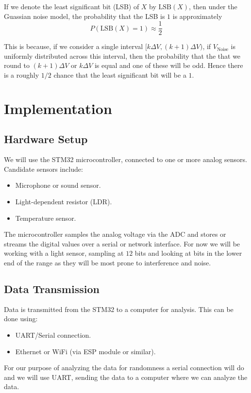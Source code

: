 If we denote the least significant bit (LSB) of \(X\) 
by \(\text{LSB}(X)\), then under the Guassian noise model, 
the probability that the LSB is \(1\) is approximately 
\[ 
    P(\text{LSB}(X) = 1) \approx \frac{1}{2} 
\]

This is because, if we consider a single interval 
\([k\Delta V, (k+1)\Delta V)\), if $V_\text{Noise}$ is uniformly 
distributed across this interval, then the probability that the 
that we round to $(k+1)\Delta V$ or $k\Delta V$ is equal and one 
of these will be odd. Hence there is a roughly $1/2$ chance 
that the least significant bit will be a $1$.


\newpage
\section{Implementation}
\subsection{Hardware Setup}
We will use the STM32 microcontroller, connected to one or more analog 
sensors. Candidate sensors include:
\begin{itemize}
    \item Microphone or sound sensor.
    \item Light-dependent resistor (LDR).
    \item Temperature sensor.
\end{itemize}

The microcontroller samples the analog voltage via the ADC and 
stores or 
streams the digital values over a serial or network interface.
For now we will be working with a light sensor, sampling 
at $12$ bits and looking at bits in the lower end of the 
range as they will be most prone to interference and noise.

\subsection{Data Transmission}
Data is transmitted from the STM32 to a computer for analysis. 
This can be done using:
\begin{itemize}
    \item UART/Serial connection.
    \item Ethernet or WiFi (via ESP module or similar).
\end{itemize}

For our purpose of analyzing the data for randomness a serial 
connection will do and we will use UART, sending the data 
to a computer where we can analyze the data.

